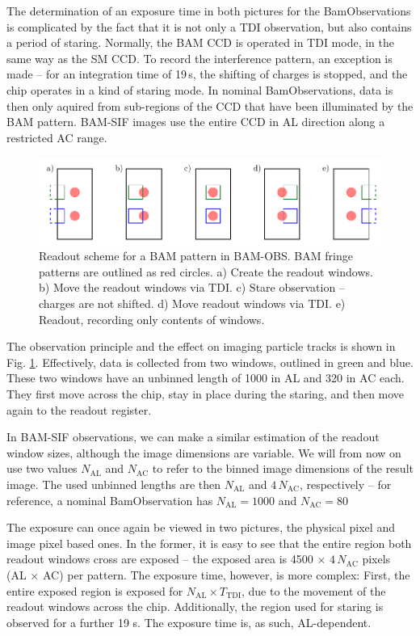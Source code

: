 \documentclass[a4paper, 11pt]{article}
\begin{document}
The determination of an exposure time in both pictures for the BamObservations is complicated by the fact that it is not only a TDI observation, but also contains a period of staring. Normally, the BAM CCD is operated in TDI mode, in the same way as the SM CCD. To record the interference pattern, an exception is made -- for an integration time of 19\,s, the shifting of charges is stopped, and the chip operates in a kind of staring mode. In nominal BamObservations, data is then only aquired from sub-regions of the CCD that have been illuminated by the BAM pattern. BAM-SIF images use the entire CCD in AL direction along a restricted AC range.

\begin{figure}[h]
  \centering
  \includegraphics{images/postprocessing/acquisition_BAM}
  \caption{Readout scheme for a BAM pattern in BAM-OBS. BAM fringe patterns are outlined as red circles. a) Create the readout windows. b) Move the readout windows via TDI. c) Stare observation -- charges are not shifted. d) Move readout windows via TDI. e) Readout, recording only contents of windows.}
  \label{fig:BAM_Acq}
\end{figure}

The observation principle and the effect on imaging particle tracks is shown in Fig. \ref{fig:BAM_Acq}. Effectively, data is collected from two windows, outlined in green and blue. These two windows have an unbinned length of 1000 in AL and 320 in AC each. They first move across the chip, stay in place during the staring, and then move again to the readout register.

In BAM-SIF observations, we can make a similar estimation of the readout window sizes, although the image dimensions are variable. We will from now on use two values $N_\mathrm{AL}$ and $N_\mathrm{AC}$ to refer to the binned image dimensions of the result image. The used unbinned lengths are then $N_\mathrm{AL}$ and $4\, N_\mathrm{AC}$, respectively -- for reference, a nominal BamObservation has $N_\mathrm{AL} = 1000$ and $N_\mathrm{AC} = 80$

The exposure can once again be viewed in two pictures, the physical pixel and image pixel based ones. In the former, it is easy to see that the entire region both readout windows cross are exposed -- the exposed area is 4500 $\times$ $4\, N_\mathrm{AC}$ pixels (AL $\times$ AC) per pattern. The exposure time, however, is more complex: First, the entire exposed region is exposed for $N_\mathrm{AL} \times T_\mathrm{TDI}$, due to the movement of the readout windows across the chip. Additionally, the region used for staring is observed for a further 19 s. The exposure time is, as such, AL-dependent.
\end{document}
